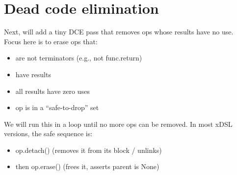 \documentclass[../main.tex]{subfiles}
\begin{document}
\section{Dead code elimination}
Next, will add a tiny DCE pass that removes ops whose results have no use.
Focus here is to erase ops that:
\begin{itemize}
    \item are not terminators (e.g., not func.return)
    \item have results
    \item all results have zero uses
    \item op is in a “safe-to-drop” set 
\end{itemize}
We will run this in a loop until no more ops can be removed.
In most xDSL versions, the safe sequence is:
\begin{itemize}
    \item op.detach() (removes it from its block / unlinks)
    \item then op.erase() (frees it, asserts parent is None)
\end{itemize}
\end{document}
